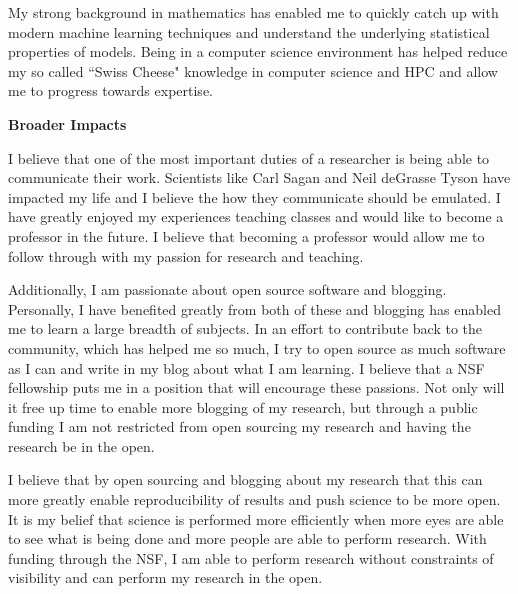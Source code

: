 \documentclass[12pt]{article}
\begin{document}
My strong background in mathematics has enabled me to quickly catch up with
modern machine learning techniques and understand the underlying statistical
properties of models. Being in a computer science environment has helped reduce
my so called ``Swiss Cheese" knowledge in computer science and HPC and allow me 
to progress towards expertise. 

\textbf{Broader Impacts}
%

I believe that one of the most important duties of a researcher is being able to
communicate their work. Scientists like Carl Sagan and Neil deGrasse Tyson have
impacted my life and I believe the how they communicate should be emulated. I
have greatly enjoyed my experiences teaching classes and would like to become a
professor in the future. I believe that becoming a professor would allow me to
follow through with my passion for research and teaching. 

Additionally, I am passionate about open source software and blogging.
Personally, I have benefited greatly from both of these and blogging has enabled
me to learn a large breadth of subjects. In an effort to contribute back to the
community, which has helped me so much, I try to open source as much software as
I can and write in my blog about what I am learning. I believe that a NSF
fellowship puts me in a position that will encourage these passions. Not only
will it free up time to enable more blogging of my research, but through a
public funding I am not restricted from open sourcing my research and having the
research be in the open.

I believe that by open sourcing and blogging about my research that this can
more greatly enable reproducibility of results and push science to be more open.
It is my belief that science is performed more efficiently when more eyes are
able to see what is being done and more people are able to perform research.
With funding through the NSF, I am able to perform research without constraints
of visibility and can perform my research in the open.

%
\end{document}
